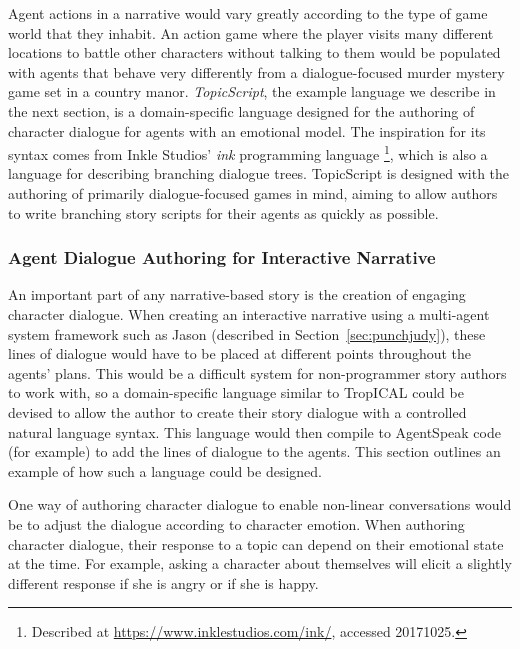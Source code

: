 \documentclass[11pt]{report}
\begin{document}
Agent actions in a narrative would vary greatly according to the type of game
world that they inhabit. An action game where the player visits many different
locations to battle other characters without talking to them would be populated
with agents that behave very differently from a dialogue-focused murder mystery
game set in a country manor. \emph{TopicScript}, the example language we
describe in the next section, is a domain-specific language designed for the
authoring of character dialogue for agents with an emotional model. The inspiration
for its syntax comes from Inkle Studios' \emph{ink} programming language
\footnote{Described at \url{https://www.inklestudios.com/ink/}, accessed 20171025.}, which is
also a language for describing branching dialogue trees. TopicScript is designed
with the authoring of primarily dialogue-focused games in mind, aiming to allow
authors to write branching story scripts for their agents as quickly as possible.

\subsubsection{Agent Dialogue Authoring for Interactive Narrative}
\label{sec:topicscript}

An important part of any narrative-based story is the creation of engaging
character dialogue. When creating an interactive narrative using a multi-agent
system framework such as Jason (described in
Section~\ref{sec:punchjudy}), these lines of dialogue would have to be
placed at different points throughout the agents' plans. This would be a difficult
system for non-programmer story authors to work with, so a domain-specific
language similar to TropICAL could be devised to allow the author to create
their story dialogue with a controlled natural language syntax. This language
would then compile to AgentSpeak code (for example) to add the lines of dialogue to
the agents. This section outlines an example of how such a language could be designed.

One way of authoring character dialogue to enable non-linear conversations would
be to adjust the dialogue according to character emotion. When authoring character dialogue, their response to a topic can depend on their
emotional state at the time. For example, asking a character about themselves will elicit a slightly different response if she is angry or if she is happy.
\end{document}
